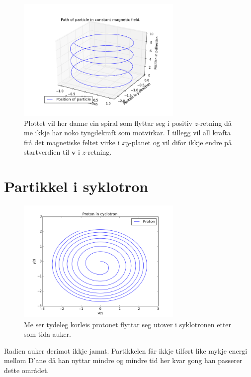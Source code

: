 \documentclass[11pt, a4paper]{article}
\begin{document}
  \begin{figure}[H]
    \centering
    \includegraphics[width=300px]{2A4.png}
    \caption{Plottet vil her danne ein spiral som flyttar seg i positiv $z$-retning då me ikkje har noko tyngdekraft som motvirkar. I tillegg vil all krafta frå det magnetiske 
    feltet virke i $xy$-planet og vil difor ikkje endre på startverdien til $\mathbf{v}$ i $z$-retning.}
  \end{figure}







\newpage
\section{Partikkel i syklotron}

  \begin{figure}[H]
    \centering
    \includegraphics[width=300px]{3A.png}
    \caption{Me ser tydeleg korleis protonet flyttar seg utover i syklotronen etter som tida auker.}
  \end{figure}
  Radien auker derimot ikkje jamnt. Partikkelen får ikkje tilført like mykje energi mellom D'ane då han nyttar mindre og mindre tid her
  kvar gong han passerer dette området.
\end{document}
